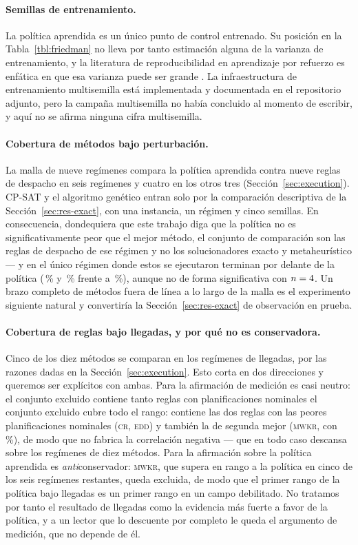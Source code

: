 \documentclass[a4paper,fleqn]{cas-sc}
\begin{document}
\paragraph{Semillas de entrenamiento.} La política aprendida es un único punto
de control entrenado. Su posición en la Tabla~\ref{tbl:friedman} no lleva por
tanto estimación alguna de la varianza de entrenamiento, y la literatura de
reproducibilidad en aprendizaje por refuerzo es enfática en que esa varianza
puede ser grande \citep{henderson2018,agarwal2021}. La infraestructura de
entrenamiento multisemilla está implementada y documentada en el repositorio
adjunto, pero la campaña multisemilla no había concluido al momento de escribir,
y aquí no se afirma ninguna cifra multisemilla.

\paragraph{Cobertura de métodos bajo perturbación.} La malla de nueve regímenes
compara la política aprendida contra nueve reglas de despacho en seis regímenes
y cuatro en los otros tres (Sección~\ref{sec:execution}). CP-SAT y el algoritmo
genético entran solo por la comparación descriptiva de la
Sección~\ref{sec:res-exact}, con una instancia, un régimen y cinco semillas. En
consecuencia, dondequiera que este trabajo diga que la política no es
significativamente peor que el mejor método,
el conjunto de comparación son las reglas de despacho de ese régimen y no los
solucionadores exacto y metaheurístico --- y en el único régimen donde estos se
ejecutaron terminan por delante de la política (\QCpsat{}\,\% y \QGa{}\,\%
frente a \QRl{}\,\%), aunque no de forma significativa con
$n=4{}$. Un brazo completo de métodos fuera de línea a lo largo de la
malla es el experimento siguiente natural y convertiría la
Sección~\ref{sec:res-exact} de observación en prueba.

\paragraph{Cobertura de reglas bajo llegadas, y por qué no es conservadora.}
Cinco de los diez métodos se comparan en los regímenes de llegadas, por las
razones dadas en la Sección~\ref{sec:execution}. Esto corta en dos direcciones y
queremos ser explícitos con ambas. Para la afirmación de medición es casi
neutro: el conjunto excluido contiene tanto reglas con planificaciones nominales
el conjunto excluido cubre todo el rango: contiene las dos reglas con las peores
planificaciones nominales (\textsc{cr}, \textsc{edd}) y también la de segunda
mejor (\textsc{mwkr}, con \NomMwkrTwo{}\,\%), de modo que no fabrica la
correlación negativa --- que en todo caso descansa sobre los \NConfRegimes{}
regímenes de diez métodos. Para la afirmación sobre la política aprendida es
\emph{anti}conservador: \textsc{mwkr}, que supera en rango a la política en
cinco de los seis regímenes restantes, queda excluida, de modo que el primer rango de la política bajo
llegadas es un primer rango en un campo debilitado. No tratamos por tanto el
resultado de llegadas como la evidencia más fuerte a favor de la política, y a
un lector que lo descuente por completo le queda el argumento de medición, que
no depende de él.
\end{document}
